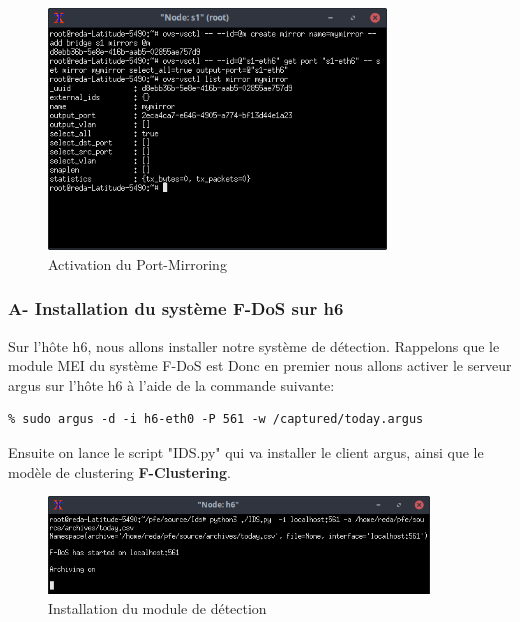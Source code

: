 \begin{figure}[h]
\centering
\includegraphics[width=0.8\textwidth]{Figures/simulation/mininet/switch/create_mirroring_port}
\decoRule
\caption{Activation du Port-Mirroring}
\label{fig:topologie}
\end{figure}

\newpage
\subsubsection{A- Installation du système F-DoS sur h6}
Sur l'hôte h6, nous allons installer notre système de détection. Rappelons que le module MEI du système F-DoS est 
Donc en premier nous allons activer le serveur argus sur l'hôte h6 à l'aide de la commande suivante:
\begin{verbatim}
% sudo argus -d -i h6-eth0 -P 561 -w /captured/today.argus
\end{verbatim}
Ensuite on lance le script "IDS.py" qui va installer le client argus, ainsi que le modèle de clustering \textbf{F-Clustering}.
\begin{figure}[h]
\centering
\includegraphics[width=0.9\textwidth]{Figures/simulation/mininet/IDS/start}
\decoRule
\caption{Installation du module de détection}
\label{fig:topologie}
\end{figure}
\newpage
